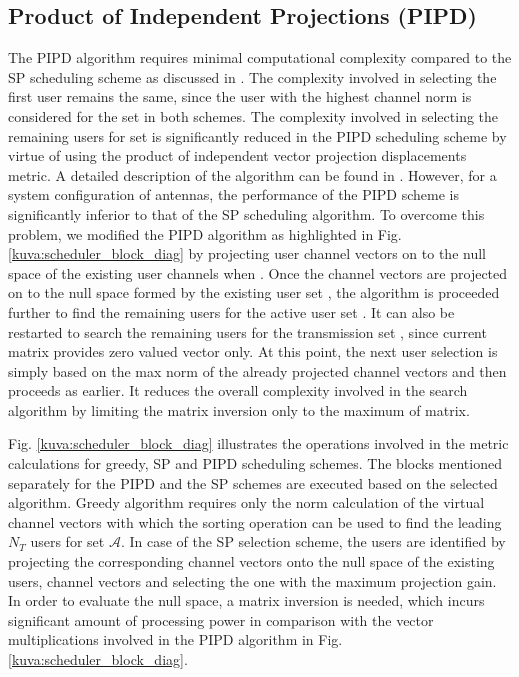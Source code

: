 \documentclass[conference,letterpaper]{./../../IEEE/IEEEtran}
\begin{document}
\subsection{Product of Independent Projections (PIPD)}
The PIPD algorithm requires minimal computational complexity compared to the SP scheduling scheme as discussed in \cite{venkatraman2014low}. The complexity involved in selecting the first user remains the same, since the user with the highest channel norm is considered for the set  in both schemes. The complexity involved in selecting the remaining users for set  is significantly reduced in the PIPD scheduling scheme by virtue of using the product of independent vector projection displacements metric. A detailed description of the algorithm can be found in \cite{venkatraman2014low}. However, for a system configuration of  antennas, the performance of the PIPD scheme is significantly inferior to that of the SP scheduling algorithm. To overcome this problem, we modified the PIPD algorithm as highlighted in Fig. \ref{kuva:scheduler_block_diag} by projecting user channel vectors on to the null space of the existing user channels when . Once the channel vectors are projected on to the null space formed by the existing user set , the algorithm is proceeded further to find the remaining users for the active user set . It can also be restarted to search the remaining  users for the transmission set , since current  matrix provides zero valued vector only. At this point, the next user selection is simply based on the max norm of the already projected channel vectors and then proceeds as earlier. It reduces the overall complexity involved in the search algorithm by limiting the matrix inversion only to the maximum of  matrix.

Fig. \ref{kuva:scheduler_block_diag} illustrates the operations involved in the metric calculations for greedy, SP and PIPD scheduling schemes. The blocks mentioned separately for the PIPD and the SP schemes are executed based on the selected algorithm. Greedy algorithm requires only the norm calculation of the virtual channel vectors with which the sorting operation can be used to find the leading $N_T$ users for set $\mathcal{A}$. In case of the SP selection scheme, the users are identified by projecting the corresponding channel vectors onto the null space of the existing users, channel vectors and selecting the one with the maximum projection gain. In order to evaluate the null space, a matrix inversion is needed, which incurs significant amount of processing power in comparison with the vector multiplications involved in the PIPD algorithm in Fig. \ref{kuva:scheduler_block_diag}.
\end{document}
